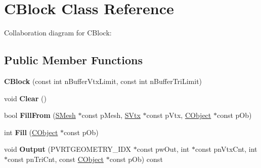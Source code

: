 \hypertarget{class_c_block}{\section{C\+Block Class Reference}
\label{class_c_block}
}


Collaboration diagram for C\+Block\+:
\subsection*{Public Member Functions}
\begin{DoxyCompactItemize}
\item 
\hypertarget{class_c_block_a136e75a79f8e4bc860af720e5086b45b}{{\bfseries C\+Block} (const int n\+Buffer\+Vtx\+Limit, const int n\+Buffer\+Tri\+Limit)}\label{class_c_block_a136e75a79f8e4bc860af720e5086b45b}

\item 
\hypertarget{class_c_block_a8ed8b22de5d699b0cbd42ec645f3b8f7}{void {\bfseries Clear} ()}\label{class_c_block_a8ed8b22de5d699b0cbd42ec645f3b8f7}

\item 
\hypertarget{class_c_block_ae4ffb3508a59ccfb5615be607ff70593}{bool {\bfseries Fill\+From} (\hyperlink{struct_s_mesh}{S\+Mesh} $\ast$const p\+Mesh, \hyperlink{struct_s_vtx}{S\+Vtx} $\ast$const p\+Vtx, \hyperlink{class_c_object}{C\+Object} $\ast$const p\+Ob)}\label{class_c_block_ae4ffb3508a59ccfb5615be607ff70593}

\item 
\hypertarget{class_c_block_a3795d9e25d50f044f283906e362c0d30}{int {\bfseries Fill} (\hyperlink{class_c_object}{C\+Object} $\ast$const p\+Ob)}\label{class_c_block_a3795d9e25d50f044f283906e362c0d30}

\item 
\hypertarget{class_c_block_aa26e5d23d83cd962cb37b302d8703d1a}{void {\bfseries Output} (P\+V\+R\+T\+G\+E\+O\+M\+E\+T\+R\+Y\+\_\+\+I\+D\+X $\ast$const pw\+Out, int $\ast$const pn\+Vtx\+Cnt, int $\ast$const pn\+Tri\+Cnt, const \hyperlink{class_c_object}{C\+Object} $\ast$const p\+Ob) const }\label{class_c_block_aa26e5d23d83cd962cb37b302d8703d1a}

\end{DoxyCompactItemize}
